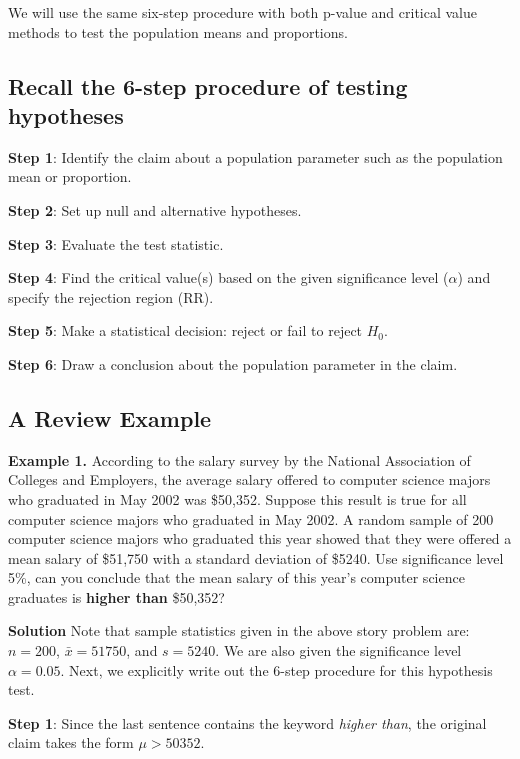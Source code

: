 \documentclass[
]{book}
\begin{document}
We will use the same six-step procedure with both p-value and critical value methods to test the population means and proportions.

\hypertarget{recall-the-6-step-procedure-of-testing-hypotheses}{%
\subsection{Recall the 6-step procedure of testing hypotheses}\label{recall-the-6-step-procedure-of-testing-hypotheses}}

\textbf{Step 1}: Identify the claim about a population parameter such as the population mean or proportion.

\textbf{Step 2}: Set up null and alternative hypotheses.

\textbf{Step 3}: Evaluate the test statistic.

\textbf{Step 4}: Find the critical value(s) based on the given significance level (\(\alpha\)) and specify the rejection region (RR).

\textbf{Step 5}: Make a statistical decision: reject or fail to reject \(H_0\).

\textbf{Step 6}: Draw a conclusion about the population parameter in the claim.

\hypertarget{a-review-example}{%
\subsection{A Review Example}\label{a-review-example}}

\textbf{Example 1.} According to the salary survey by the National Association of Colleges and Employers, the average salary offered to computer science majors who graduated in May 2002 was \$50,352. Suppose this result is true for all computer science majors who graduated in May 2002. A random sample of 200 computer science majors who graduated this year showed that they were offered a mean salary of \$51,750 with a standard deviation of \$5240. Use significance level 5\%, can you conclude that the mean salary of this year's computer science graduates is \textbf{higher than} \$50,352?

\textbf{Solution} Note that sample statistics given in the above story problem are: \(n = 200\), \(\bar{x} = 51750\), and \(s = 5240\). We are also given the significance level \(\alpha = 0.05\). Next, we explicitly write out the 6-step procedure for this hypothesis test.

\textbf{Step 1}: Since the last sentence contains the keyword \emph{higher than}, the original claim takes the form \(\mu > 50352\).
\end{document}

